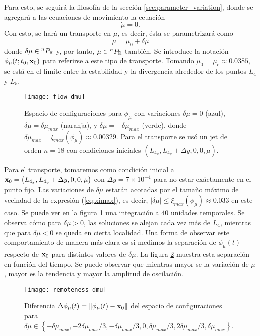 Para esto, se seguirá la filosofía de la sección \ref{sec:parameter_variation}, donde se agregará a las ecuaciones de movimiento la ecuación 
\begin{equation*}
 \dot{\mu} = 0.
\end{equation*}
Con esto, se hará un transporte en $\mu$, es decir, ésta se parametrizará como 
\begin{equation*}
 \mu = \mu_0 + \delta\mu
\end{equation*}   
donde $\delta\mu \in {^{n}P_{\mathbb{R}}}$ y, por tanto, $\mu \in {^{n}P_{\mathbb{R}}}$ también. Se introduce la notación $\phi_\mu(t;t_0,\mathbf{x}_0)$ para referirse a este tipo de transporte. Tomando $\mu_0 = \mu_c \approx 0.0385$, se está en el límite entre la estabilidad y la divergencia alrededor de los puntos $L_4$ y $L_5$.

\begin{figure}
 \centering
 \texttt{[image: flow\_dmu]}
 \caption{Espacio de configuraciones para $\phi_\mu$ con variaciones $\delta\mu = 0$ (azul), $\delta\mu = \delta\mu_{max}$ (naranja), y $\delta\mu = -\delta\mu_{max}$ (verde), donde $\delta\mu_{max} = \xi_{max}(\phi_\mu) \approx 0.00329$. Para el transporte se usó un jet de orden $n=18$ con condiciones iniciales $\left( L_{4_x}, L_{4_y} + \Delta y, 0, 0, \mu \right)$.}
 \label{fig:flow_dmu}
\end{figure}

Para el transporte, tomaremos como condición inicial a $\mathbf{x}_0 = \left( L_{4_x}, L_{4_y} + \Delta y, 0, 0, \mu \right)$ con $\Delta y = 7\times 10^{-4}$ para no estar exáctamente en el punto fijo. Las variaciones de $\delta\mu$ estarán acotadas por el tamaño máximo de vecindad de la expresión (\ref{eq:ximax}), es decir, $\lvert \delta\mu \rvert \leq  \xi_{max}(\phi_\mu) \approx 0.033$ en este caso. Se puede ver en la figura \ref{fig:flow_dmu} una integración a $40$ unidades temporales. Se observa cómo para $\delta \mu > 0$, las soluciones se alejan cada vez más de $L_4$, mientras que para $\delta \mu < 0$ se queda en cierta localidad. Una forma de observar este comportamiento de manera más clara es si medimos la separación de $\phi_\mu(t)$ respecto de $\mathbf{x}_0$ para distintos valores de $\delta \mu$. La figura \ref{fig:remoteness_dmu} muestra esta separación en función del tiempo. Se puede observar que mientras mayor se la variación de $\mu$, mayor es la tendencia y mayor la amplitud de oscilación. 

\begin{figure}
 \centering
 \texttt{[image: remoteness\_dmu]}
 \caption{Diferencia $\Delta\phi_\mu(t) = \left\lVert \phi_\mu(t) - \mathbf{x}_0 \right\rVert$ del espacio de configuraciones para $\delta\mu \in \left\lbrace -\delta\mu_{max}, -2\delta\mu_{max}/3, -\delta\mu_{max}/3, 0, \delta\mu_{max}/3, 2\delta\mu_{max}/3, \delta\mu_{max}  \right\rbrace$.}
 \label{fig:remoteness_dmu}
\end{figure}

